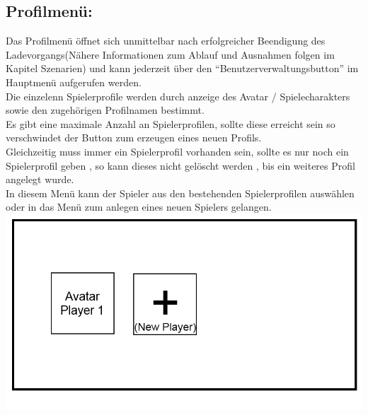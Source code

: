 \documentclass{scrartcl}
\begin{document}
\begin{enumerate}
\begin{minipage}{1\textwidth}
		\item \subsection*{Profilmenü:} \label{appaufbau:Profilmenue}
		Das Profilmenü öffnet sich unmittelbar nach erfolgreicher Beendigung des Ladevorgangs(Nähere Informationen zum Ablauf und Ausnahmen folgen im Kapitel Szenarien) und kann jederzeit über den \enquote{Benutzerverwaltungsbutton} im Hauptmenü aufgerufen werden.\\
		Die einzelenn Spielerprofile werden durch anzeige des Avatar / Spielecharakters sowie den zugehörigen Profilnamen bestimmt.\\
		Es gibt eine maximale Anzahl an Spielerprofilen, sollte diese erreicht sein so verschwindet der Button zum erzeugen eines neuen Profils.\\
		Gleichzeitig muss immer ein Spielerprofil vorhanden sein, sollte es nur noch ein Spielerprofil geben , so kann dieses nicht gelöscht werden , bis ein weiteres Profil angelegt wurde.\\
		In diesem Menü kann der Spieler aus den bestehenden Spielerprofilen auswählen oder in das Menü zum anlegen eines neuen Spielers gelangen.\\
		\includegraphics[width=\textwidth]{assets/PlayerScreen}
	\end{minipage}
	

\end{enumerate}
\end{document}
